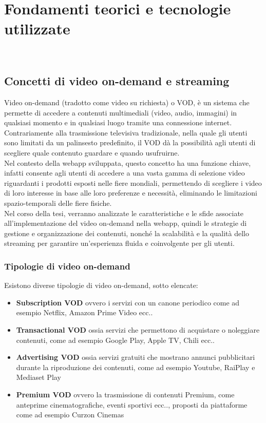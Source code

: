 \chapter{Fondamenti teorici e tecnologie utilizzate}
\label{cap:fondamentiteorici}
\\

\section{Concetti di video on-demand e streaming}
Video on-demand (tradotto come video su richiesta) o VOD, è un sistema che permette di accedere a contenuti multimediali (video, audio, immagini) 
in qualsiasi momento e in qualsiasi luogo tramite una connessione internet.
Contrariamente alla trasmissione televisiva tradizionale, nella quale gli utenti sono limitati da un palinsesto predefinito, 
il VOD dà la possibilità agli utenti di scegliere quale contenuto guardare e quando usufruirne.\\
Nel contesto della webapp sviluppata, questo concetto ha una funzione chiave, infatti consente agli utenti di accedere a una vasta gamma di selezione video riguardanti 
i prodotti esposti nelle fiere mondiali, 
permettendo di scegliere i video di loro interesse in base alle loro preferenze e necessità, eliminando le limitazioni spazio-temporali delle fiere fisiche.\\
Nel corso della tesi, verranno analizzate le caratteristiche e le sfide associate all'implementazione del video on-demand nella webapp, quindi le strategie 
di gestione e organizzazione dei contenuti, nonché la scalabilità e la qualità dello streaming per garantire un'esperienza fluida e coinvolgente per gli utenti.
\subsection{Tipologie di video on-demand}
Esistono diverse tipologie di video on-demand, sotto elencate:

\begin{itemize}
    \item \textbf{Subscription VOD} ovvero i servizi con un canone periodico come ad esempio Netflix, Amazon Prime Video ecc..\\
    \item \textbf{Transactional VOD} ossia servizi che permettono di acquistare o noleggiare contenuti, come ad esempio Google Play, Apple TV, Chili ecc..\\
    \item \textbf{Advertising VOD} ossia servizi gratuiti che mostrano annunci pubblicitari durante la riproduzione dei contenuti, come ad esempio Youtube, RaiPlay e Mediaset Play\\
    \item \textbf{Premium VOD} ovvero la trasmissione di contenuti Premium, come anteprime cinematografiche, eventi sportivi ecc.., proposti da piattaforme come ad esempio Curzon Cinemas\\
\end{itemize}

